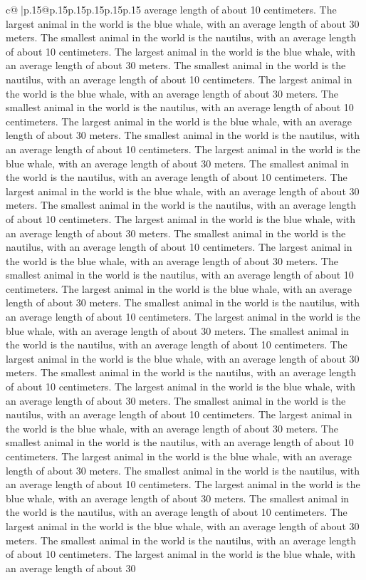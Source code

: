 \documentclass{article}
\begin{document}
{\begin{supertabular}{c@{$\;$}|p{.15\linewidth}@{}p{.15\linewidth}p{.15\linewidth}p{.15\linewidth}p{.15\linewidth}p{.15\linewidth}}
{{{average length of about 10 centimeters. The largest animal in the world is the blue whale, with an average length of about 30 meters. The smallest animal in the world is the nautilus, with an average length of about 10 centimeters. The largest animal in the world is the blue whale, with an average length of about 30 meters. The smallest animal in the world is the nautilus, with an average length of about 10 centimeters. The largest animal in the world is the blue whale, with an average length of about 30 meters. The smallest animal in the world is the nautilus, with an average length of about 10 centimeters. The largest animal in the world is the blue whale, with an average length of about 30 meters. The smallest animal in the world is the nautilus, with an average length of about 10 centimeters. The largest animal in the world is the blue whale, with an average length of about 30 meters. The smallest animal in the world is the nautilus, with an average length of about 10 centimeters. The largest animal in the world is the blue whale, with an average length of about 30 meters. The smallest animal in the world is the nautilus, with an average length of about 10 centimeters. The largest animal in the world is the blue whale, with an average length of about 30 meters. The smallest animal in the world is the nautilus, with an average length of about 10 centimeters. The largest animal in the world is the blue whale, with an average length of about 30 meters. The smallest animal in the world is the nautilus, with an average length of about 10 centimeters. The largest animal in the world is the blue whale, with an average length of about 30 meters. The smallest animal in the world is the nautilus, with an average length of about 10 centimeters. The largest animal in the world is the blue whale, with an average length of about 30 meters. The smallest animal in the world is the nautilus, with an average length of about 10 centimeters. The largest animal in the world is the blue whale, with an average length of about 30 meters. The smallest animal in the world is the nautilus, with an average length of about 10 centimeters. The largest animal in the world is the blue whale, with an average length of about 30 meters. The smallest animal in the world is the nautilus, with an average length of about 10 centimeters. The largest animal in the world is the blue whale, with an average length of about 30 meters. The smallest animal in the world is the nautilus, with an average length of about 10 centimeters. The largest animal in the world is the blue whale, with an average length of about 30 meters. The smallest animal in the world is the nautilus, with an average length of about 10 centimeters. The largest animal in the world is the blue whale, with an average length of about 30 meters. The smallest animal in the world is the nautilus, with an average length of about 10 centimeters. The largest animal in the world is the blue whale, with an average length of about 30 meters. The smallest animal in the world is the nautilus, with an average length of about 10 centimeters. The largest animal in the world is the blue whale, with an average length of about 30 }}}
\end{supertabular}}
\end{document}
